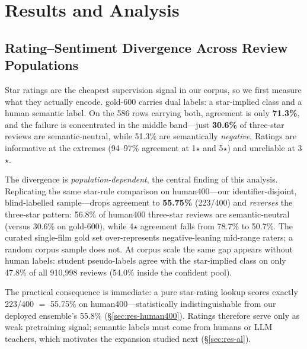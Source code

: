 \section{Results and Analysis}
\label{sec:results}

\subsection{Rating--Sentiment Divergence Across Review Populations}
\label{sec:res-rating}

Star ratings are the cheapest supervision signal in our corpus, so we
first measure what they actually encode. gold-600 carries dual labels:
a star-implied class and a human semantic label. On the 586 rows
carrying both, agreement is only \textbf{71.3\%}, and the failure is
concentrated in the middle band---just \textbf{30.6\%} of three-star
reviews are semantic-neutral, while 51.3\% are semantically
\emph{negative}. Ratings are informative at the extremes (94--97\%
agreement at 1$\star$ and 5$\star$) and unreliable at 3$\star$.

The divergence is \emph{population-dependent}, the central finding of
this analysis. Replicating the same star-rule comparison on
human400---our identifier-disjoint, blind-labelled sample---drops
agreement to \textbf{55.75\%} (223/400) and \emph{reverses} the
three-star pattern: 56.8\% of human400 three-star reviews are
semantic-neutral (versus 30.6\% on gold-600), while 4$\star$ agreement
falls from 78.7\% to 50.7\%. The curated single-film gold set
over-represents negative-leaning mid-range raters; a random corpus
sample does not. At corpus scale the same gap appears without human
labels: student pseudo-labels agree with the star-implied class on
only 47.8\% of all 910{,}998 reviews (54.0\% inside the confident
pool).

The practical consequence is immediate: a pure star-rating lookup
scores exactly 223/400 $=$ 55.75\% on human400---statistically
indistinguishable from our deployed ensemble's 55.8\%
(\S\ref{sec:res-human400}). Ratings therefore serve only as weak
pretraining signal; semantic labels must come from humans or LLM
teachers, which motivates the expansion studied next
(\S\ref{sec:res-al}).

